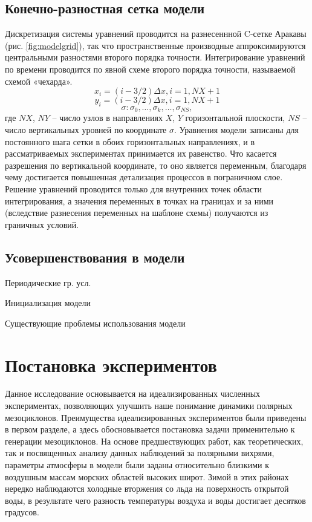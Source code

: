 \documentclass[12pt,a4paper]{report}
\begin{document}
\subsection{Конечно-разностная сетка модели}
Дискретизация системы уравнений проводится на разнесеннной C-сетке Аракавы (рис. \ref{fig:modelgrid}), так что пространственные производные аппроксимируются центральными разностями второго порядка точности. Интегрирование уравнений по времени проводится по явной схеме второго порядка точности, называемой схемой «чехарда».
$$x_i=(i-3/2)\Delta x,i=1,NX+1$$
$$y_i=(i-3/2)\Delta x,i=1,NX+1$$
$$\sigma: \sigma_0, \dots, \sigma_k,\dots,\sigma_{NS},$$
где $NX$, $NY$ – число узлов в направлениях $X$, $Y$ горизонтальной плоскости, $NS$ – число вертикальных уровней по координате $\sigma$. Уравнения модели записаны для постоянного шага сетки в обоих горизонтальных направлениях, и в рассматриваемых экспериментах принимается их равенство. Что касается разрешения по вертикальной координате, то оно является переменным, благодаря чему достигается повышенная детализация процессов в пограничном слое. 
Решение уравнений проводится только для внутренних точек области интегрирования, а значения переменных в точках на границах и за ними (вследствие разнесения переменных на шаблоне схемы) получаются из граничных условий.

\subsection{Усовершенствования в модели}
\begin{sqlist}
\item Периодические гр. усл.
\item Инициализация модели
\item Существующие проблемы использования модели
\end{sqlist}

\section{Постановка экспериментов}
\label{sec:expsetup}
Данное исследование основывается на идеализированных численных экспериментах, позволяющих улучшить наше понимание динамики полярных мезоциклонов. Преимущества идеализированных экспериментов были приведены в первом разделе, а здесь обосновывается постановка задачи применительно к генерации мезоциклонов.
На основе предшествующих работ, как теоретических, так и посвященных анализу данных наблюдений за полярными вихрями, параметры атмосферы в модели были заданы относительно близкими к воздушным массам морских областей высоких широт. Зимой в этих районах нередко наблюдаются холодные вторжения со льда на поверхность открытой воды, в результате чего разность температуры воздуха и воды  достигает десятков градусов.
\end{document}
